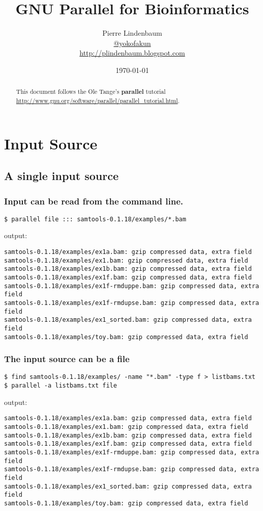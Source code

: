 \documentclass{article}
\date{\today}
\title{GNU Parallel for Bioinformatics}
\author{Pierre Lindenbaum\\\href{https://twitter.com/yokofakun}{@yokofakun}\\\url{http://plindenbaum.blogspot.com} }
\def\prl{\textbf{parallel}}
\begin{document}
\maketitle
\begin{abstract}
This document follows the Ole Tange's \prl{} tutorial \url{http://www.gnu.org/software/parallel/parallel_tutorial.html}.
\end{abstract}

\tableofcontents

\section{Input Source}
\subsection{A single input source}
\subsubsection{Input can be read from the command line.}
\begin{lstlisting}
$ parallel file ::: samtools-0.1.18/examples/*.bam
\end{lstlisting}
output:
\begin{lstlisting}
samtools-0.1.18/examples/ex1a.bam: gzip compressed data, extra field
samtools-0.1.18/examples/ex1.bam: gzip compressed data, extra field
samtools-0.1.18/examples/ex1b.bam: gzip compressed data, extra field
samtools-0.1.18/examples/ex1f.bam: gzip compressed data, extra field
samtools-0.1.18/examples/ex1f-rmduppe.bam: gzip compressed data, extra field
samtools-0.1.18/examples/ex1f-rmdupse.bam: gzip compressed data, extra field
samtools-0.1.18/examples/ex1_sorted.bam: gzip compressed data, extra field
samtools-0.1.18/examples/toy.bam: gzip compressed data, extra field
\end{lstlisting}

\subsubsection{The input source can be a file}
\begin{lstlisting}
$ find samtools-0.1.18/examples/ -name "*.bam" -type f > listbams.txt
$ parallel -a listbams.txt file
\end{lstlisting}
output:
\begin{lstlisting}
samtools-0.1.18/examples/ex1a.bam: gzip compressed data, extra field
samtools-0.1.18/examples/ex1.bam: gzip compressed data, extra field
samtools-0.1.18/examples/ex1b.bam: gzip compressed data, extra field
samtools-0.1.18/examples/ex1f.bam: gzip compressed data, extra field
samtools-0.1.18/examples/ex1f-rmduppe.bam: gzip compressed data, extra field
samtools-0.1.18/examples/ex1f-rmdupse.bam: gzip compressed data, extra field
samtools-0.1.18/examples/ex1_sorted.bam: gzip compressed data, extra field
samtools-0.1.18/examples/toy.bam: gzip compressed data, extra field
\end{lstlisting}
\end{document}
